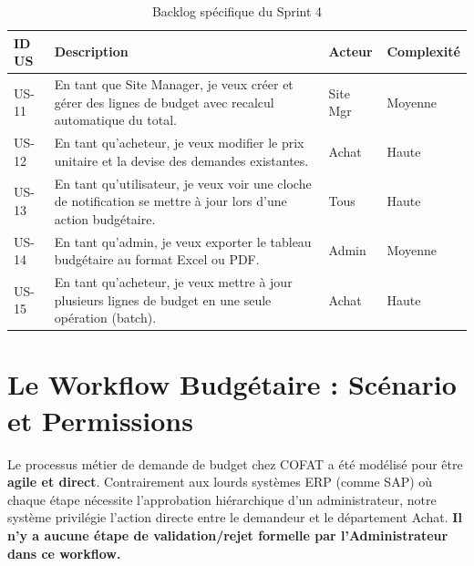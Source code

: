 \begin{table}[h]
\centering
\begin{tabular}{|p{1.5cm}|p{8.5cm}|p{2cm}|p{2cm}|}
\hline
\textbf{ID US} & \textbf{Description} & \textbf{Acteur} & \textbf{Complexité} \\ \hline
US-11 & En tant que Site Manager, je veux créer et gérer des lignes de budget avec recalcul automatique du total. & Site Mgr & Moyenne \\ \hline
US-12 & En tant qu'acheteur, je veux modifier le prix unitaire et la devise des demandes existantes. & Achat & Haute \\ \hline
US-13 & En tant qu'utilisateur, je veux voir une cloche de notification se mettre à jour lors d'une action budgétaire. & Tous & Haute \\ \hline
US-14 & En tant qu'admin, je veux exporter le tableau budgétaire au format Excel ou PDF. & Admin & Moyenne \\ \hline
US-15 & En tant qu'acheteur, je veux mettre à jour plusieurs lignes de budget en une seule opération (batch). & Achat & Haute \\ \hline
\end{tabular}
\caption{Backlog spécifique du Sprint 4}
\label{tab:backlog_sprint4}
\end{table}

\section{Le Workflow Budgétaire : Scénario et Permissions}
Le processus métier de demande de budget chez COFAT a été modélisé pour être \textbf{agile et direct}. Contrairement aux lourds systèmes ERP (comme SAP) où chaque étape nécessite l'approbation hiérarchique d'un administrateur, notre système privilégie l'action directe entre le demandeur et le département Achat. \textbf{Il n'y a aucune étape de validation/rejet formelle par l'Administrateur dans ce workflow.}

